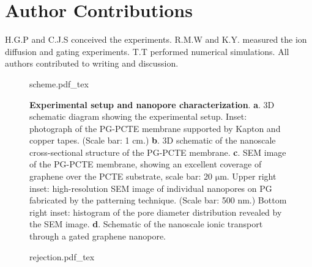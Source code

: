 
\section{Author Contributions}
\label{sec:np-np-author-contrib}

H.G.P and C.J.S conceived the experiments. R.M.W and K.Y. measured the ion
diffusion and gating experiments. T.T performed numerical
simulations. All authors contributed to writing and discussion.


\begin{figure}[!htbp]
  \centering
  {scheme.pdf_tex}
  \caption{\textbf{Experimental setup and nanopore characterization}.
    \textbf{a}. 3D schematic diagram showing the experimental
    setup. Inset: photograph of the PG-PCTE membrane supported by
    Kapton and copper tapes. (Scale bar: 1 cm.) \textbf{b}. 3D schematic
    of the nanoscale cross-sectional structure of the PG-PCTE
    membrane. \textbf{c}. SEM image of the PG-PCTE membrane, showing an
    excellent coverage of graphene over the PCTE substrate, scale bar:
    20 $\mathrm{\mu}$m.  Upper right inset: high-resolution SEM image
    of individual nanopores on PG fabricated by the patterning
    technique. (Scale bar: 500 nm.) Bottom right inset: histogram of the
    pore diameter distribution revealed by the SEM
    image. \textbf{d}. Schematic of the nanoscale ionic transport
    through a gated graphene nanopore.}
  \label{fig:np-1}
\end{figure}

\begin{figure}[!htbp]
  {rejection.pdf_tex}
\end{figure}

